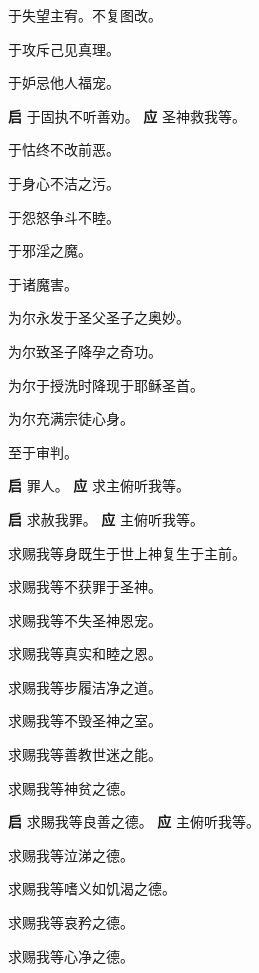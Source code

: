 \documentclass[UTF8,17pt]{ctexart}
\begin{document}
 于失望主宥。不复图改。

 于攻斥⼰见真理。

 于妒忌他⼈福宠。

\textbf{启} \quad 于固执不听善劝。 \hfill \textbf{应} \quad 圣神救我等。

 于怙终不改前恶。

 于⾝⼼不洁之污。

 于怨怒争⽃不睦。

 于邪淫之魔。

 于诸魔害。

 为尔永发于圣⽗圣⼦之奥妙。

 为尔致圣⼦降孕之奇功。

 为尔于授洗时降现于耶稣圣⾸。

 为尔充满宗徒⼼⾝。

 ⾄于审判。

\textbf{启} \quad 罪⼈。 \hfill \textbf{应} \quad 求主俯听我等。

\textbf{启} \quad 求赦我罪。 \hfill \textbf{应} \quad 主俯听我等。\phantom{c}

 求赐我等⾝既⽣于世上神复⽣于主前。

 求赐我等不获罪于圣神。

 求赐我等不失圣神恩宠。

 求赐我等真实和睦之恩。

 求赐我等步履洁净之道。

 求赐我等不毁圣神之室。

 求赐我等善教世迷之能。

 求赐我等神贫之德。

\textbf{启} \quad 求賜我等良善之德。 \hfill \textbf{应} \quad 主俯听我等。

 求赐我等泣涕之德。

 求赐我等嗜义如饥渴之德。

 求赐我等哀矜之德。

 求赐我等⼼净之德。
\end{document}
